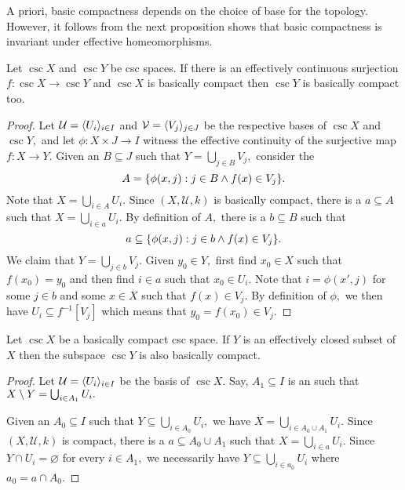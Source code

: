 \documentclass[csc]{subfiles}
\begin{document}
\noindent
A priori, basic compactness depends on the choice of base for the topology.
However, it follows from the next proposition shows that basic compactness is invariant under effective homeomorphisms.

\begin{proposition}[\RCA]\label{P:BCompactImage}
  Let \(\csc{X}\) and \(\csc{Y}\) be csc spaces.
  If there is an effectively continuous surjection \(f:\csc{X}\to\csc{Y}\) and \(\csc{X}\) is basically compact then \(\csc{Y}\) is basically compact too.
\end{proposition}

\begin{proof}
  Let \(\mathcal{U} = \langle U_i\rangle_{i \in I}\) and \(\mathcal{V} = \langle V_j\rangle_{j \in J}\) be the respective bases of \(\csc{X}\) and \(\csc{Y},\) and let \(\phi:X \times J \to I\) witness the effective continuity of the surjective map \(f:X \to Y.\)
  Given an \eset{} \(B \subseteq J\) such that \(Y = \bigcup_{j \in B} V_j,\) consider the \eset{} \[A = \lbrace\phi(x,j) : j \in B \land f(x) \in V_j\rbrace.\]
  Note that \(X = \bigcup_{i \in A} U_i.\)
  Since \((X,\mathcal{U},k)\) is basically compact, there is a \fset{} \(a \subseteq A\) such that \(X = \bigcup_{i \in a} U_i.\)
  By definition of \(A,\) there is a \fset{} \(b \subseteq B\) such that \[a \subseteq \lbrace\phi(x,j) : j \in b \land f(x) \in V_j\rbrace.\]
  We claim that \(Y = \bigcup_{j \in b} V_j.\)
  Given \(y_0 \in Y,\) first find \(x_0 \in X\) such that \(f(x_0) = y_0\) and then find \(i \in a\) such that \(x_0 \in U_i.\)
  Note that \(i = \phi(x',j)\) for some \(j \in b\) and some \(x \in X\) such that \(f(x) \in V_j.\)
  By definition of \(\phi,\) we then have \(U_i \subseteq f^{-1}[V_j]\) which means that \(y_0 = f(x_0) \in V_j.\)
\end{proof}

\begin{proposition}[\RCA]\label{P:BCompactSubspace}
  Let \(\csc{X}\) be a basically compact csc space.
  If \(Y\) is an effectively closed subset of \(X\) then the subspace \(\csc{Y}\) is also basically compact.
\end{proposition}

\begin{proof}
  Let \(\mathcal{U} = \langle U_i\rangle_{i \in I}\) be the basis of \(\csc{X}.\)
  Say, \(A_1 \subseteq I\) is an \eset{} such that \(X \setminus Y = \bigcup_{i \in A_1} U_i.\)
  
  Given an \eset{} \(A_0 \subseteq I\) such that \(Y \subseteq \bigcup_{i \in A_0} U_i,\) we have \(X = \bigcup_{i \in A_0 \cup A_1} U_i.\) 
  Since \((X,\mathcal{U},k)\) is compact, there is a \fset{} \(a \subseteq A_0 \cup A_1\) such that \(X = \bigcup_{i \in a} U_i.\)
  Since \(Y \cap U_i = \varnothing\) for every \(i \in A_1,\) we necessarily have \(Y \subseteq \bigcup_{i \in a_0} U_i\) where \(a_0 = a \cap A_0.\)
\end{proof}
\end{document}
